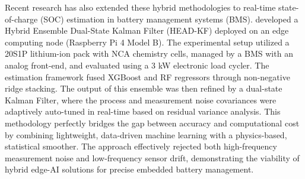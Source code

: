 Recent research has also extended these hybrid methodologies to real-time state-of-charge (SOC) estimation in battery management systems (BMS). \cite{Tau_2025} developed a Hybrid Ensemble Dual-State Kalman Filter (HEAD-KF) deployed on an edge computing node (Raspberry Pi 4 Model B). The experimental setup utilized a 20S1P lithium-ion pack with NCA chemistry cells, managed by a BMS with an analog front-end, and evaluated using a 3 kW electronic load cycler. The estimation framework fused XGBoost and RF regressors through non-negative ridge stacking. The output of this ensemble was then refined by a dual-state Kalman Filter, where the process and measurement noise covariances were adaptively auto-tuned in real-time based on residual variance analysis. This methodology perfectly bridges the gap between accuracy and computational cost by combining lightweight, data-driven machine learning with a physics-based, statistical smoother. The approach effectively rejected both high-frequency measurement noise and low-frequency sensor drift, demonstrating the viability of hybrid edge-AI solutions for precise embedded battery management.